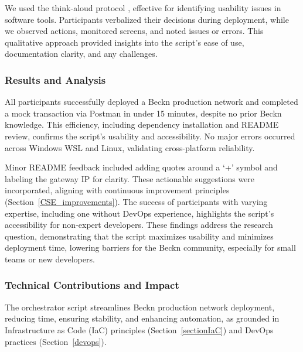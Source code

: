 We used the think-aloud protocol \citep{nielsen_1993}, effective for identifying usability issues in software tools. Participants verbalized their decisions during deployment, while we observed actions, monitored screens, and noted issues or errors. This qualitative approach provided insights into the script’s ease of use, documentation clarity, and any challenges.

\subsubsection{Results and Analysis}
All participants successfully deployed a Beckn production network and completed a mock transaction via Postman in under 15 minutes, despite no prior Beckn knowledge. This efficiency, including dependency installation and README review, confirms the script’s usability and accessibility. No major errors occurred across Windows WSL and Linux, validating cross-platform reliability.

Minor README feedback included adding quotes around a `+' symbol and labeling the gateway IP for clarity. These actionable suggestions were incorporated, aligning with continuous improvement principles (Section~\ref{CSE_improvements}). The success of participants with varying expertise, including one without DevOps experience, highlights the script’s accessibility for non-expert developers. These findings address the research question, demonstrating that the script maximizes usability and minimizes deployment time, lowering barriers for the Beckn community, especially for small teams or new developers.

\subsubsection{Technical Contributions and Impact} \label{tech_contribution_and_impact}
The orchestrator script streamlines Beckn production network deployment, reducing time, ensuring stability, and enhancing automation, as grounded in Infrastructure as Code (IaC) principles (Section~\ref{sectionIaC}) and DevOps practices (Section~\ref{devops}).

